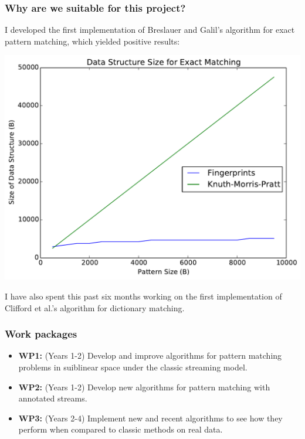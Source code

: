 \documentclass{beamer}
\begin{document}

\begin{frame}
\frametitle{Why are we suitable for this project?}
I developed the first implementation of Breslauer and Galil's algorithm for exact pattern matching, which yielded positive results:

\begin{center}
\includegraphics[width=0.5\paperwidth]{exact_size}
\end{center}

I have also spent this past six months working on the first implementation of Clifford et al.'s algorithm for dictionary matching.
\end{frame}


\begin{frame}
\frametitle{Work packages}
\begin{itemize}
\item\textbf{WP1:} (Years 1-2) Develop and improve algorithms for pattern matching problems in suiblinear space under the classic streaming model.
\item\textbf{WP2:} (Years 1-2) Develop new algorithms for pattern matching with annotated streams.
\item\textbf{WP3:} (Years 2-4) Implement new and recent algorithms to see how they perform when compared to classic methods on real data.
\end{itemize}
\end{frame}
\end{document}
